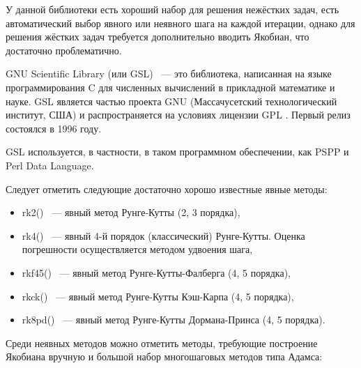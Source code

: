 У данной библиотеки есть хороший набор для решения нежёстких задач, есть автоматический выбор явного или неявного шага на каждой
итерации, однако для решения жёстких задач требуется дополнительно вводить Якобиан, что достаточно проблематично.

GNU Scientific Library (или GSL) ~--- это библиотека, написанная на языке программирования C для численных вычислений в прикладной
математике и науке. GSL является частью проекта GNU (Массачусетский технологический институт, США) и распространяется на условиях
лицензии GPL \cite{Wikipedia8}. Первый релиз состоялся в 1996 году.

GSL используется, в частности, в таком программном обеспечении, как PSPP и Perl Data Language.

Следует отметить следующие достаточно хорошо известные явные методы:

\begin{itemize}
    \item rk2() ~--- явный метод Рунге-Кутты (2, 3 порядка),
    \item rk4() ~--- явный 4-й порядок (классический) Рунге-Кутты. Оценка погрешности осуществляется методом удвоения шага,
    \item rkf45() ~--- явный метод Рунге-Кутты-Фалберга (4, 5 порядка),
    \item rkck() ~--- явный метод Рунге-Кутты Кэш-Карпа (4, 5 порядка),
    \item rk8pd() ~--- явный метод Рунге-Кутты Дормана-Принса (4, 5 порядка).
\end{itemize}

Среди неявных методов можно отметить методы, требующие построение Якобиана вручную и большой набор многошаговых методов типа
Адамса:

